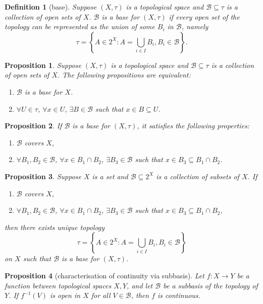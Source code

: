 \documentclass{report}
\newtheorem{definition}{Definition}[section]
\newtheorem{proposition}{Proposition}[section]
\theoremstyle{nonumberplain}
\begin{document}
\begin{definition}[base]
	Suppose $(X,\tau)$ is a topological space and $\mathcal{B}\subseteq \tau $ is a collection of open sets of $X$. $\mathcal{B}$ is a \emph{base} for $(X,\tau)$ if every open set of the topology can be represented as the union of some $B_i$ in $\mathcal{B}$, namely
	\[
		\tau=\left\{A\in 2^X:A=\bigcup_{i\in I} B_i,B_i\in\mathcal{B}\right\}.
	\]
\end{definition}
\begin{proposition}
	Suppose $(X,\tau)$ is a topological space and $\mathcal{B}\subseteq \tau $ is a collection of open sets of $X$. The following propositions are equivalent:
	\begin{enumerate}
		\item $\mathcal{B}$ is a base for $X$.
		\item $\forall U\in \tau$, $\forall x\in U$, $\exists B\in\mathcal{B}$ such that $x\in B\subseteq U$. 
	\end{enumerate}
\end{proposition}

\begin{proposition}
	If $\mathcal{B}$ is a base for $(X,\tau)$, it satisfies the following properties:
\begin{enumerate}
	\item $\mathcal{B}$ covers $X$,
	\item $\forall B_1,B_2\in\mathcal{B}$, $\forall x\in B_1\cap B_2$, $\exists B_3\in \mathcal{B}$ such that $x\in B_3\subseteq B_1\cap B_2$.
\end{enumerate}
\end{proposition}

\begin{proposition}
	Suppose $X$ is a set and $\mathcal{B}\subseteq 2^X $ is a collection of subsets of $X$. If
\begin{enumerate}
	\item $\mathcal{B}$ covers $X$,
	\item $\forall B_1,B_2\in\mathcal{B}$, $\forall x\in B_1\cap B_2$, $\exists B_3\in \mathcal{B}$ such that $x\in B_3\subseteq B_1\cap B_2$,
\end{enumerate}
then there exists unique topology
\[
	\tau=\left\{A\in 2^X:A=\bigcup_{i\in I} B_i,B_i\in\mathcal{B}\right\}
\]
on $X$ such that $\mathcal{B}$ is a base for $(X,\tau)$.
\end{proposition}

\begin{proposition}[characterisation of continuity via subbasis]
	Let $f: X \rightarrow Y$ be a function between topological spaces $X, Y$, and let $\mathcal{B}$ be a subbasis of the topology of $Y$. If $f^{-1}(V)$ is open in $X$ for all $V \in \mathcal{B}$, then $f$ is continuous.
\end{proposition}
\end{document}
